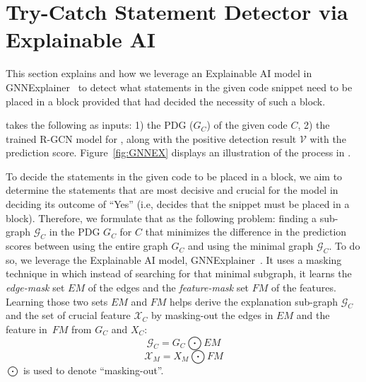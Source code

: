\section{Try-Catch Statement Detector via Explainable AI}
\label{interpretation:sec}

This section explains {\xstate} and how we leverage an Explainable AI
model in GNNExplainer~\cite{GNNExplainer} to detect what statements in
the given code snippet need to be placed in a  block
provided that {\xblock} had decided the necessity of such a block.

{\xstate} takes the following as inputs: 1) the PDG ($G_C$) of the
given code $C$, 2) the trained R-GCN model for {\xblock}, along with
the positive detection result $\mathcal{V}$ with the prediction score.
Figure~\ref{fig:GNNEX} displays an illustration of the process in
{\xstate}.






To decide the statements in the given code to be placed in a
 block, we aim to determine the statements that are
most decisive and crucial for the {\xblock} model in deciding its
outcome of ``Yes'' (i.e, {\xblock} decides that the snippet must be
placed in a  block). Therefore, we formulate that as
the following problem: finding a sub-graph $\mathcal{G}_C$ in the PDG
$G_C$ for $C$ that minimizes the difference in the prediction scores
between using the entire graph $G_C$ and using the minimal graph
$\mathcal{G}_C$. To do so, we leverage the Explainable AI model,
GNNExplainer~\cite{GNNExplainer}. It uses a masking technique in which
instead of searching for that minimal subgraph, it learns the {\em
  edge-mask} set $EM$ of the edges and the {\em feature-mask} set $FM$
of the features. Learning those two sets $EM$ and $FM$ helps derive
the explanation sub-graph $\mathcal{G}_C$ and the set of crucial
feature $\mathcal{X}_C$ by masking-out the edges in $EM$ and the
feature in~$FM$ from $G_C$ and $X_C$:
\begin{equation}\label{eq:11}
\mathcal{G}_C = G_C \bigodot EM
\end{equation}
\begin{equation}\label{eq:12}
\mathcal{X}_M = X_M \bigodot FM
\end{equation}
$\bigodot$ is used to denote ``masking-out''.

